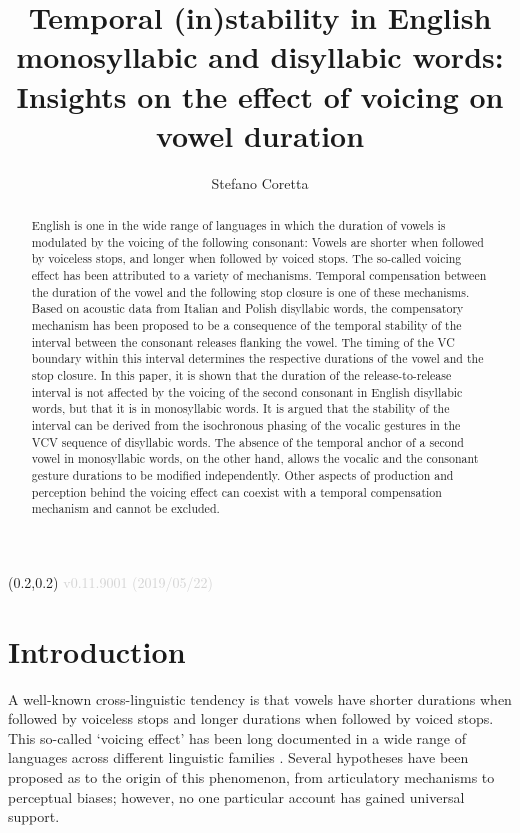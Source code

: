 \documentclass[
  12pt,
  a4paper,
]{article}
\title{Temporal (in)stability in English monosyllabic and disyllabic words:
Insights on the effect of voicing on vowel duration}
\author{Stefano Coretta}
\date{}
\begin{document}
\begin{textblock}{3}(0.2,0.2)
  \textcolor{lightgray}{v0.11.9001 (2019/05/22)}
\end{textblock}
\maketitle

\begin{abstract}
English is one in the wide range of languages in which the duration of vowels is modulated by the voicing of the following consonant: Vowels are shorter when followed by voiceless stops, and longer when followed by voiced stops.
The so-called voicing effect has been attributed to a variety of mechanisms.
Temporal compensation between the duration of the vowel and the following stop closure is one of these mechanisms.
Based on acoustic data from Italian and Polish disyllabic words, the compensatory mechanism has been proposed to be a consequence of the temporal stability of the interval between the consonant releases flanking the vowel.
The timing of the VC boundary within this interval determines the respective durations of the vowel and the stop closure.
In this paper, it is shown that the duration of the release-to-release interval is not affected by the voicing of the second consonant in English disyllabic words, but that it is in monosyllabic words.
It is argued that the stability of the interval can be derived from the isochronous phasing of the vocalic gestures in the VCV sequence of disyllabic words.
The absence of the temporal anchor of a second vowel in monosyllabic words, on the other hand, allows the vocalic and the consonant gesture durations to be modified independently.
Other aspects of production and perception behind the voicing effect can coexist with a temporal compensation mechanism and cannot be excluded.
\end{abstract}

\hypertarget{introduction}{%
\section{Introduction}\label{introduction}}

\label{s:intro}

A well-known cross-linguistic tendency is that vowels have shorter
durations when followed by voiceless stops and longer durations when
followed by voiced stops. This so-called `voicing effect' has been long
documented in a wide range of languages across different linguistic
families \citep{maddieson1976, begus2017}. Several hypotheses have been
proposed as to the origin of this phenomenon, from articulatory
mechanisms to perceptual biases; however, no one particular account has
gained universal support.
\end{document}
